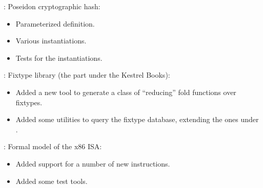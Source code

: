 
\begin{frame}

\newlibtitle

:
Poseidon cryptographic hash:
\begin{itemize}
\item Parameterized definition.
\item Various instantiations.
\item Tests for the instantiations.
\end{itemize}

\end{frame}


\begin{frame}

\implibtitle

:
Fixtype library (the part under the Kestrel Books):
\begin{itemize}
\item Added a new  tool
      to generate a class of ``reducing'' fold functions over fixtypes.
\item Added some utilities to query the fixtype database,
      extending the ones under .
\end{itemize}

\end{frame}


\begin{frame}

\implibtitle

:
Formal model of the x86 ISA:
\begin{itemize}
\item Added support for a number of new instructions.
\item Added some test tools.
\end{itemize}

\end{frame}



